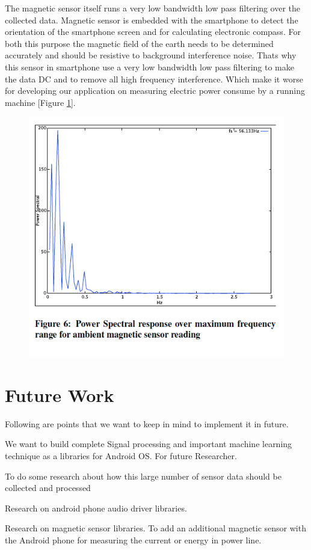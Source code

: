 \documentclass[11pt]{amsart}
\begin{document}
The magnetic sensor itself runs a very low bandwidth low pass filtering over the collected data. Magnetic sensor is embedded with the smartphone to detect the orientation of the smartphone screen and for calculating electronic compass. For both this purpose the magnetic field of the earth needs to be determined accurately and should be resistive to background interference noise. Thats why this sensor in smartphone use a very low bandwidth low pass filtering to make the data DC and to remove all high frequency interference. Which make it worse for developing our application on measuring electric power consume by a running machine [Figure \ref{fig:magnetic3}].


\begin{figure}[htb]
\begin{center}
\includegraphics[width=1.0\linewidth, angle = 0]{magnetic3.png}
\label{fig:magnetic3}
\end{center}
\end{figure}

\section{Future Work}

Following are points that we want to keep in mind to implement it in future.
\begin{itemize*}
\item We want to build complete Signal processing and important machine learning technique as  a libraries for Android OS. For future Researcher.
\item To do some research about how this large number of sensor data should be collected and processed
\item Research on android phone audio driver libraries.
\item Research on magnetic sensor libraries. To add an additional magnetic sensor with the Android phone for measuring the current or energy in power line.
\end{itemize*}
\end{document}
